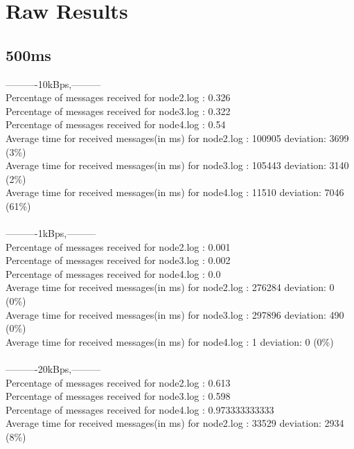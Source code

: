 \section {Raw Results} \label{RawResults}
    \subsection{500ms}\label{RawResults:500ms}
        ----------10kBps,---------\\
        Percentage of messages received for node2.log : 0.326\\
        Percentage of messages received for node3.log : 0.322\\
        Percentage of messages received for node4.log : 0.54\\
        Average time for received messages(in ms) for  node2.log : 100905   deviation: 3699 (3\%)\\
        Average time for received messages(in ms) for  node3.log : 105443   deviation: 3140 (2\%)\\
        Average time for received messages(in ms) for  node4.log : 11510    deviation: 7046 (61\%)\\\\
        ----------1kBps,---------\\
        Percentage of messages received for node2.log : 0.001\\
        Percentage of messages received for node3.log : 0.002\\
        Percentage of messages received for node4.log : 0.0\\
        Average time for received messages(in ms) for  node2.log : 276284   deviation: 0 (0\%)\\
        Average time for received messages(in ms) for  node3.log : 297896   deviation: 490 (0\%)\\
        Average time for received messages(in ms) for  node4.log : 1    deviation: 0 (0\%)\\\\
        ----------20kBps,---------\\
        Percentage of messages received for node2.log : 0.613\\
        Percentage of messages received for node3.log : 0.598\\
        Percentage of messages received for node4.log : 0.973333333333\\
        Average time for received messages(in ms) for  node2.log : 33529    deviation: 2934 (8\%)\\

